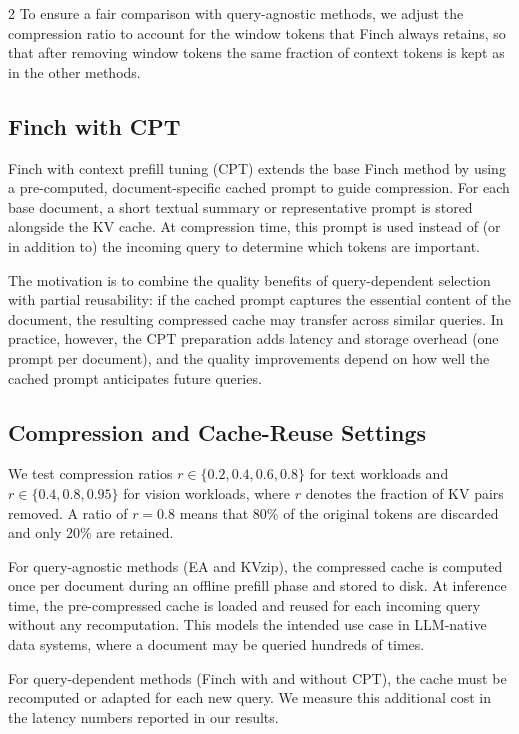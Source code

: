 \documentclass[10pt,a4paper]{article}
\begin{document}
\begin{multicols}{2}
To ensure a fair comparison with query-agnostic methods, we adjust the
compression ratio to account for the window tokens that Finch always
retains, so that after removing window tokens the same fraction of context
tokens is kept as in the other methods.

\subsection{Finch with CPT}

Finch with context prefill tuning (CPT) extends the base Finch method by
using a pre-computed, document-specific cached prompt to guide
compression. For each base document, a short textual summary or
representative prompt is stored alongside the KV cache. At compression
time, this prompt is used instead of (or in addition to) the incoming
query to determine which tokens are important.

The motivation is to combine the quality benefits of query-dependent
selection with partial reusability: if the cached prompt captures the
essential content of the document, the resulting compressed cache may
transfer across similar queries. In practice, however, the CPT
preparation adds latency and storage overhead (one prompt per document),
and the quality improvements depend on how well the cached prompt
anticipates future queries.

\subsection{Compression and Cache-Reuse Settings}

We test compression ratios $r \in \{0.2, 0.4, 0.6, 0.8\}$ for text
workloads and $r \in \{0.4, 0.8, 0.95\}$ for vision workloads, where
$r$ denotes the fraction of KV pairs removed. A ratio of $r=0.8$ means
that 80\% of the original tokens are discarded and only 20\% are
retained.

For query-agnostic methods (EA and KVzip), the compressed cache is
computed once per document during an offline prefill phase and stored to
disk. At inference time, the pre-compressed cache is loaded and reused
for each incoming query without any recomputation. This models the
intended use case in LLM-native data systems, where a document may be
queried hundreds of times.

For query-dependent methods (Finch with and without CPT), the cache must
be recomputed or adapted for each new query. We measure this additional
cost in the latency numbers reported in our results.


\end{multicols}
\end{document}
